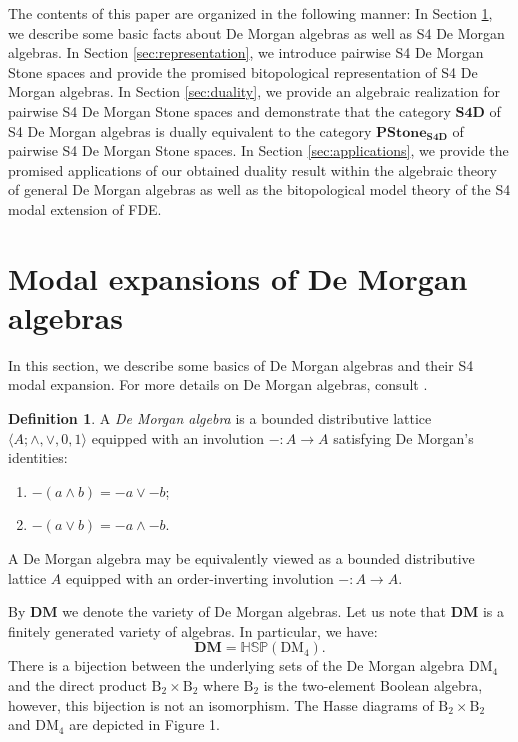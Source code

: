 \documentclass{amsart}
\theoremstyle{plain}
\newcommand{\tuple}[1]{\ensuremath{\langle{#1}\rangle}}
\theoremstyle{definition}
\newtheorem{definition}[theorem]{Definition}
\begin{document}
The contents of this paper are organized in the following manner: In Section \ref{sec:preliminaries}, we describe some basic facts about De Morgan algebras as well as S4 De Morgan algebras. In Section \ref{sec:representation}, we introduce pairwise S4 De Morgan Stone spaces and provide the promised bitopological representation of S4 De Morgan algebras. In Section \ref{sec:duality}, we provide an algebraic realization for pairwise S4 De Morgan Stone spaces and demonstrate that the category $\mathbf{S4D}$ of S4 De Morgan algebras is dually equivalent to the category $\mathbf{PStone_{S4D}}$ of pairwise S4 De Morgan Stone spaces. In Section \ref{sec:applications}, we provide the promised applications of our obtained duality result within the algebraic theory of general De Morgan algebras as well as the bitopological model theory of the S4 modal extension of FDE.    
   

\section{Modal expansions of De Morgan algebras} \label{sec:preliminaries}



In this section, we describe some basics of De Morgan algebras and their S4 modal expansion. For more details on De Morgan algebras, consult \cite{prenosil, pynko}. 
\begin{definition}
    A \emph{De Morgan algebra} is a bounded distributive lattice $\tuple{A;\wedge,\vee,0,1}$ equipped with an involution $-\colon A\to A$ satisfying De Morgan's identities: 
    \begin{enumerate}
        \item $-(a\wedge b)=-a\vee-b$;
        \item $-(a\vee b)=-a\wedge-b$. 
        \end{enumerate}
         \end{definition}
A De Morgan algebra may be equivalently viewed as a bounded distributive lattice $A$ equipped with an order-inverting involution $-\colon A\to A$.


By $\mathbf{DM}$ we denote the variety of De Morgan algebras. Let us note that $\mathbf{DM}$ is a finitely generated variety of algebras. In particular, we have: 
\[\mathbf{DM}=\mathbb{HSP}(\text{DM}_4).\] There is a bijection between the underlying sets of the De Morgan algebra $\text{DM}_4$ and the direct product $\text{B}_2\times \text{B}_2$ where $\text{B}_2$ is the two-element Boolean algebra, however, this bijection is not an isomorphism.
The Hasse diagrams of $\text{B}_2\times \text{B}_2$ and $\text{DM}_4$ are depicted in Figure 1. 
\end{document}
